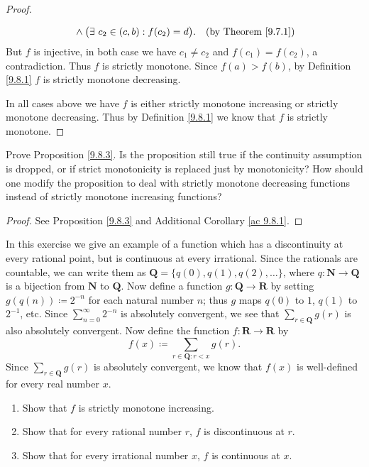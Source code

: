 \begin{proof}
\begin{enumerate}
\begin{align*}
                           & \land \big(\exists\ c_2 \in (c, b) : f(c_2) = d\big).         & \text{(by Theorem \ref{9.7.1})} \\
              \end{align*}
              But \(f\) is injective, in both case we have \(c_1 \neq c_2\) and \(f(c_1) = f(c_2)\), a contradiction.
              Thus \(f\) is strictly monotone.
              Since \(f(a) > f(b)\), by Definition \ref{9.8.1} \(f\) is strictly monotone decreasing.
    \end{enumerate}
    In all cases above we have \(f\) is either strictly monotone increasing or strictly monotone decreasing.
    Thus by Definition \ref{9.8.1} we know that \(f\) is strictly monotone.
\end{proof}

\begin{exercise}\label{ex 9.8.4}
    Prove Proposition \ref{9.8.3}.
    Is the proposition still true if the continuity assumption is dropped, or if strict monotonicity is replaced just by monotonicity?
    How should one modify the proposition to deal with strictly monotone decreasing functions instead of strictly monotone increasing functions?
\end{exercise}

\begin{proof}
    See Proposition \ref{9.8.3} and Additional Corollary \ref{ac 9.8.1}.
\end{proof}

\begin{exercise}\label{ex 9.8.5}
    In this exercise we give an example of a function which has a discontinuity at every rational point, but is continuous at every irrational.
    Since the rationals are countable, we can write them as \(\mathbf{Q} = \{q(0), q(1), q(2), \dots\}\), where \(q : \mathbf{N} \to \mathbf{Q}\) is a bijection from \(\mathbf{N}\) to \(\mathbf{Q}\).
    Now define a function \(g : \mathbf{Q} \to \mathbf{R}\) by setting \(g(q(n)) \coloneqq 2^{-n}\) for each natural number \(n\);
    thus \(g\) maps \(q(0)\) to \(1\), \(q(1)\) to \(2^{-1}\), etc.
    Since \(\sum_{n = 0}^\infty 2^{-n}\) is absolutely convergent, we see that \(\sum_{r \in \mathbf{Q}} g(r)\) is also absolutely convergent.
    Now define the function \(f : \mathbf{R} \to \mathbf{R}\) by
    \[
        f(x) \coloneqq \sum_{r \in \mathbf{Q} : r < x} g(r).
    \]
    Since \(\sum_{r \in \mathbf{Q}} g(r)\) is absolutely convergent, we know that \(f(x)\) is well-defined for every real number \(x\).
    \begin{enumerate}
        \item Show that \(f\) is strictly monotone increasing.
        \item Show that for every rational number \(r\), \(f\) is discontinuous at \(r\).
        \item Show that for every irrational number \(x\), \(f\) is continuous at \(x\).
    \end{enumerate}
\end{exercise}


